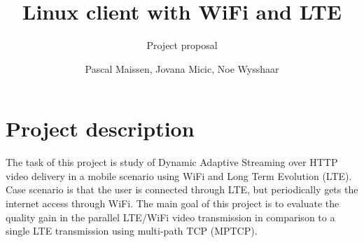 \documentclass{llncs}
\begin{document}
\title{Linux client with WiFi and LTE}


\subtitle{Project proposal}


\author{Pascal Maissen, Jovana Micic, Noe Wysshaar} 








\maketitle


\section{Project description}
The task of this project is study of Dynamic Adaptive Streaming over HTTP video delivery in a mobile scenario using WiFi and Long Term Evolution (LTE). Case scenario is that the user is connected through LTE, but periodically gets the internet access through WiFi. The main goal of this project is to evaluate the quality gain in the parallel LTE/WiFi video transmission in comparison to a single LTE transmission using multi-path TCP (MPTCP). 
\end{document}
